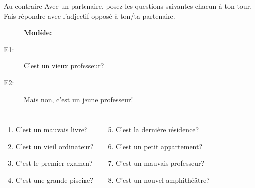 \documentclass{beamer}
\begin{document}
  \begin{frame}{Au contraire}
    Avec un partenaire, posez les questions suivantes chacun à ton tour.
    Fais répondre avec l'adjectif opposé à ton/ta partenaire. \\
    \begin{center}
      \begin{description}
        \item[] \textbf{Modèle:}
        \item[E1:] C'est un vieux professeur?
        \item[E2:] Mais non, c'est un jeune professeur!
      \end{description}
      \begin{columns}
          \begin{enumerate}
            \item C'est un mauvais livre?
            \item C'est un vieil ordinateur?
            \item C'est le premier examen?
            \item C'est une grande piscine?
          \end{enumerate}
          \begin{enumerate}
            \setcounter{enumi}{4}
            \item C'est la dernière résidence?
            \item C'est un petit appartement?
            \item C'est un mauvais professeur?
            \item C'est un nouvel amphithéâtre?
          \end{enumerate}
      \end{columns}
    \end{center}
  \end{frame}
\end{document}
